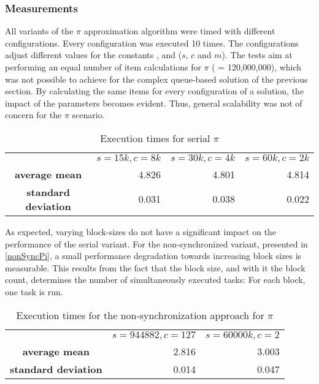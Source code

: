 \subsubsection{Measurements}
All variants of the $\pi$ approximation algorithm were timed with different configurations. Every configuration was executed 10 times. The configurations adjust different values for the constants ,  and  ($s$, $c$ and $m$). The tests aim at performing an equal number of item calculations for $\pi$ (  = 120,000,000), which was not possible to achieve for the complex queue-based solution of the previous section. By calculating the same items for every configuration of a solution, the impact of the parameters becomes evident. Thus, general scalability was not of concern for the $\pi$ scenario.

\begin{table}[h!]
\begin{center}
\begin{tabular}{ c| r|r|r|}
\cline{2-4}  & $s = 15k, c = 8k$ & $s = 30k, c = 4k$ & $s = 60k, c = 2k$\\ 
\cline{2-4} \textbf{average mean} & 4.826 & 4.801 & 4.814 \\ 
\cline{2-4} \textbf{standard deviation} & 0.031 & 0.038 & 0.022 \\ 
\cline{2-4}
\end{tabular} 
\caption{Execution times for serial $\pi$}
\label{table:serial_pi}
\end{center}
\end{table}

As expected, varying block-sizes do not have a significant impact on the performance of the serial variant. For the non-synchronized variant, presented in \ref{nonSyncPi}, a small performance degradation towards increasing block sizes is measurable. This results from the fact that the block size, and with it the block count, determines the number of simultaneously executed tasks: For each block, one task is run.

\begin{table}[h!]
\begin{center}
\begin{tabular}{ c| r|r|}
\cline{2-3}  & $s = 944882, c = 127$ & $s = 60000k, c = 2$\\ 
\cline{2-3} \textbf{average mean} & 2.816 & 3.003\\ 
\cline{2-3} \textbf{standard deviation} & 0.014 & 0.047 \\ 
\cline{2-3}
\end{tabular} 
\caption{Execution times for the non-synchronization approach for $\pi$}
\label{table:nonsync_pi}
\end{center}
\end{table}

